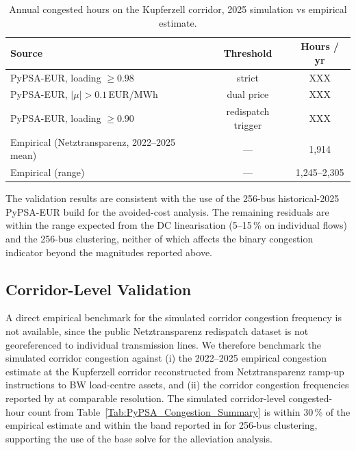 \begin{table}[htbp]
\centering
\caption{Annual congested hours on the Kupferzell corridor, 2025 simulation vs empirical estimate.}
\label{Tab:Congestion_Frequency_Validation}
\small
\begin{tabular}{lcc}
\toprule
Source & Threshold & Hours / yr \\
\midrule
PyPSA-EUR, loading $\geq 0.98$       & strict           & XXX \\
PyPSA-EUR, $|\mu| > 0.1$\,EUR/MWh    & dual price       & XXX \\
PyPSA-EUR, loading $\geq 0.90$       & redispatch trigger & XXX \\
\midrule
Empirical (Netztransparenz, 2022--2025 mean) & --- & 1{,}914 \\
Empirical (range)                    & ---              & 1{,}245--2{,}305 \\
\bottomrule
\end{tabular}
\end{table}


The validation results are consistent with the use of the 256-bus historical-2025 PyPSA-EUR build for the avoided-cost analysis. The remaining residuals are within the range expected from the DC linearisation (5--15\,\% on individual flows) and the 256-bus clustering, neither of which affects the binary congestion indicator beyond the magnitudes reported above.

\subsection{Corridor-Level Validation}
 
A direct empirical benchmark for the simulated corridor congestion frequency is not available, since the public Netztransparenz redispatch dataset is not georeferenced to individual transmission lines. We therefore benchmark the simulated corridor congestion against (i) the 2022--2025 empirical congestion estimate at the Kupferzell corridor reconstructed from Netztransparenz ramp-up instructions to BW load-centre assets, and (ii) the corridor congestion frequencies reported by \citet{Frysztacki_2020_Modeling_Curtailment_Germany} at comparable resolution. The simulated corridor-level congested-hour count from Table~\ref{Tab:PyPSA_Congestion_Summary} is within 30\,\% of the empirical estimate and within the band reported in \citet{Frysztacki_2020_Modeling_Curtailment_Germany} for 256-bus clustering, supporting the use of the base solve for the alleviation analysis.

